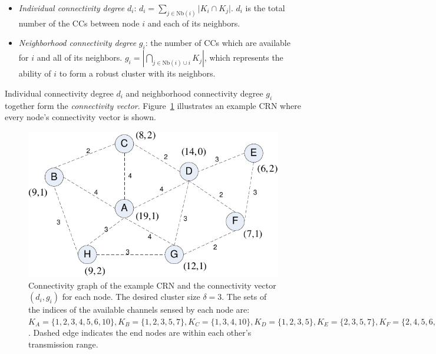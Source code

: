 \documentclass[times]{ettauth}
\theoremstyle{mytheoremstyle}
\theoremstyle{mytheoremstyle}
\theoremstyle{mytheoremstyle}
\begin{document}




\begin{itemize}

\item \textit{Individual connectivity degree} $d_i$: $d_i=\sum_{j\in \text{Nb}(i)}\vert K_i\cap K_j\vert$. 
$d_i$ is the total number of the CCs between node $i$ and each of its neighbors.

\item \textit{Neighborhood connectivity degree} $g_i$: the number of CCs which are available for $i$ and all of its neighbors.
$g_i=|\bigcap_{j\in \text{Nb}(i)\cup i}K_j|$, which represents the ability of $i$ to form a robust cluster with its neighbors.
\end{itemize}
Individual connectivity degree $d_i$ and neighborhood connectivity degree $g_i$ together form the \textit{connectivity vector}.
Figure~\ref{fig1} illustrates an example CRN where every node's connectivity vector is shown.	
\begin{figure}[ht!]
  \centering
\includegraphics[width=0.7\linewidth]{figure1.pdf}
	\caption{Connectivity graph of the example CRN and the connectivity vector $(d_i, g_i)$ for each node. The desired cluster size $\delta =3$. The sets of the indices of the available channels sensed by each node are: $K_A=\{1,2,3,4,5,6,10\}, K_B=\{1,2,3,5,7\}, K_C=\{1,3,4,10\}, K_D=\{1,2,3,5\}, K_E=\{2,3,5,7\}, K_F=\{2,4,5,6,7\}, K_G=\{1,2,3,4,8\}, K_H=\{1,2,5,8\}$. Dashed edge indicates the end nodes are within each other's transmission range.}
	\label{fig1}
\end{figure}

	
\end{document}
